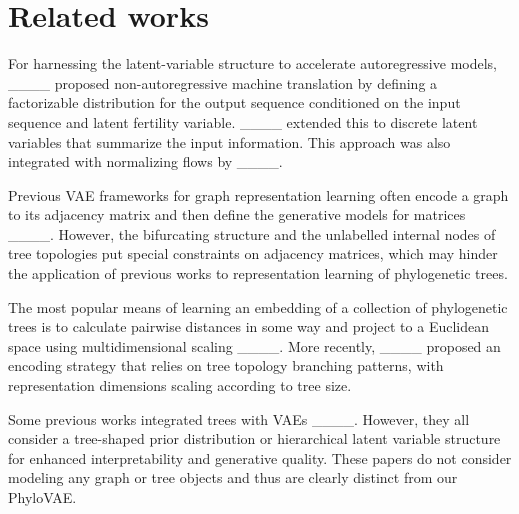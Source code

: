 \section{Related works}
For harnessing the latent-variable structure to accelerate autoregressive models, ____ proposed non-autoregressive machine translation by defining a factorizable distribution for the output sequence conditioned on the input sequence and latent fertility variable. 
____ extended this to discrete latent variables that summarize the input information.
This approach was also integrated with normalizing flows by ____.

Previous VAE frameworks for graph representation learning often encode a graph to its adjacency matrix and then define the generative models for matrices ____.
However, the bifurcating structure and the unlabelled internal nodes of tree topologies put special constraints on adjacency matrices, which may hinder the application of previous works to representation learning of phylogenetic trees.

The most popular means of learning an embedding of a collection of phylogenetic trees is to calculate pairwise distances in some way and project to a Euclidean space using multidimensional scaling ____.
More recently, ____ proposed an encoding strategy that relies on tree topology branching patterns, with representation dimensions scaling according to tree size.

{ Some previous works integrated trees with VAEs ____. However, they all consider a tree-shaped prior distribution or hierarchical latent variable structure for enhanced interpretability and generative quality. These papers do not consider modeling any graph or tree objects and thus are clearly distinct from our PhyloVAE.}
